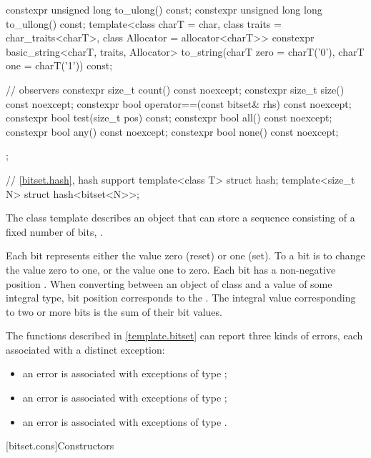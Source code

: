 \begin{codeblock}
{{    constexpr unsigned long to_ulong() const;
    constexpr unsigned long long to_ullong() const;
    template<class charT = char,
             class traits = char_traits<charT>,
             class Allocator = allocator<charT>>
      constexpr basic_string<charT, traits, Allocator>
        to_string(charT zero = charT('0'), charT one = charT('1')) const;

    // observers
    constexpr size_t count() const noexcept;
    constexpr size_t size() const noexcept;
    constexpr bool operator==(const bitset& rhs) const noexcept;
    constexpr bool test(size_t pos) const;
    constexpr bool all() const noexcept;
    constexpr bool any() const noexcept;
    constexpr bool none() const noexcept;
  };

  // \ref{bitset.hash}, hash support
  template<class T> struct hash;
  template<size_t N> struct hash<bitset<N>>;
}
\end{codeblock}

\pnum
The class template
describes an object that can store a sequence consisting of a fixed number of
bits, .

\pnum
Each bit represents either the value zero (reset) or one (set).
To
a bit is to change the value zero to one, or the value one to
zero.
Each bit has a non-negative position .
When converting
between an object of class
and a value of some
integral type, bit position  corresponds to the
.
The integral value corresponding to two
or more bits is the sum of their bit values.

\pnum
The functions described in \ref{template.bitset} can report three kinds of
errors, each associated with a distinct exception:
\begin{itemize}
\item
an
error is associated with exceptions of type
;
%
\item
an
error is associated with exceptions of type
;
%
\item
an
error is associated with exceptions of type
.
%
\end{itemize}

[bitset.cons]{Constructors}

